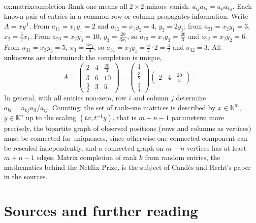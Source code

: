 \begin{solution}{ex:matrixcompletion}
\idea Rank one means all $2\times2$ minors vanish: $a_{ij}a_{kl}=a_{il}a_{kj}$. Each known pair of entries in a common row or
column propagates information.
\writeup Write $A=xy^{\mathsf T}$. From $a_{11}=x_1y_1=2$ and $a_{12}=x_1y_2=4$, $y_2=2y_1$; from $a_{21}=x_2y_1=3$,
$x_2=\frac32x_1$. From $a_{23}=x_2y_3=10$, $y_3=\frac{20}{3x_1}$, so $a_{13}=x_1y_3=\frac{20}3$ and $a_{22}=x_2y_2=6$. From
$a_{33}=x_3y_3=5$, $x_3=\frac{3x_1}4$, so $a_{31}=x_3y_1=\frac34\cdot2=\frac32$ and $a_{32}=3$. All unknowns are determined:
the completion is unique,
\[
A=\begin{pmatrix}2&4&\frac{20}3\\3&6&10\\\frac32&3&5\end{pmatrix}=\begin{pmatrix}1\\\frac32\\\frac34\end{pmatrix}\begin{pmatrix}2&4&\frac{20}3\end{pmatrix}.
\]
In general, with all entries non-zero, row $i$ and column $j$ determine $a_{kl}=a_{kj}a_{il}/a_{ij}$. Counting: the set of
rank-one matrices is described by $x\in\mathbb K^m$, $y\in\mathbb K^n$ up to the scaling $(tx,t^{-1}y)$, that is $m+n-1$
parameters; more precisely, the bipartite graph of observed positions (rows and columns as vertices) must be connected for
uniqueness, since otherwise one connected component can be rescaled independently, and a connected graph on $m+n$ vertices
has at least $m+n-1$ edges. Matrix completion of rank $k$ from random entries, the mathematics behind the Netflix Prize, is
the subject of Cand\`es and Recht's paper in the sources.
\end{solution}

\section*{Sources and further reading}

